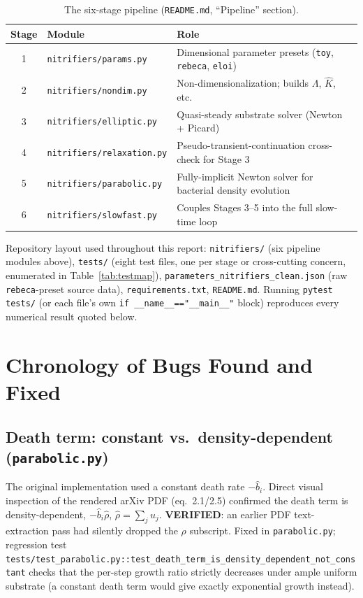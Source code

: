\documentclass[11pt]{article}
\newcommand{\verified}{\textcolor{green!45!black}{\textbf{VERIFIED}}}
\newcommand{\code}[1]{\texttt{#1}}
\newcommand{\test}[1]{\texttt{\small #1}}
\begin{document}
\begin{table}[h]
\centering
\small
\begin{tabular}{clp{8.5cm}}
\toprule
Stage & Module & Role \\
\midrule
1 & \code{nitrifiers/params.py} & Dimensional parameter presets (\code{toy}, \code{rebeca}, \code{eloi}) \\
2 & \code{nitrifiers/nondim.py} & Non-dimensionalization; builds $\Lambda$, $\hat K$, etc. \\
3 & \code{nitrifiers/elliptic.py} & Quasi-steady substrate solver (Newton + Picard) \\
4 & \code{nitrifiers/relaxation.py} & Pseudo-transient-continuation cross-check for Stage 3 \\
5 & \code{nitrifiers/parabolic.py} & Fully-implicit Newton solver for bacterial density evolution \\
6 & \code{nitrifiers/slowfast.py} & Couples Stages 3--5 into the full slow-time loop \\
\bottomrule
\end{tabular}
\caption{The six-stage pipeline (\code{README.md}, ``Pipeline'' section).}
\label{tab:pipeline}
\end{table}

\noindent Repository layout used throughout this report:
\code{nitrifiers/} (six pipeline modules above), \code{tests/} (eight test
files, one per stage or cross-cutting concern, enumerated in
Table~\ref{tab:testmap}), \code{parameters\_nitrifiers\_clean.json} (raw
\code{rebeca}-preset source data), \code{requirements.txt}, \code{README.md}.
Running \code{pytest tests/} (or each file's own \code{if
\_\_name\_\_=="\_\_main\_\_"} block) reproduces every numerical result quoted
below.

\section{Chronology of Bugs Found and Fixed}

\subsection{Death term: constant vs.\ density-dependent (\code{parabolic.py})}
The original implementation used a constant death rate $-\hat b_i$. Direct
visual inspection of the rendered arXiv PDF (eq.\ 2.1/2.5) confirmed the
death term is density-dependent, $-\hat b_i \hat\rho$, $\hat\rho=\sum_j u_j$.
\verified{}: an earlier PDF text-extraction pass had silently dropped the
$\rho$ subscript. Fixed in \code{parabolic.py}; regression test
\test{tests/test\_parabolic.py::test\_death\_term\_is\_density\_dependent\_not\_constant}
checks that the per-step growth ratio strictly decreases under ample uniform
substrate (a constant death term would give exactly exponential growth
instead).
\end{document}
